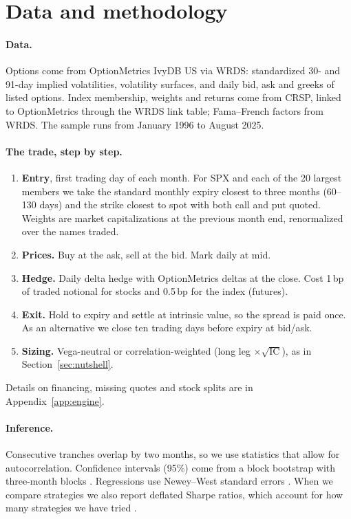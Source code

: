 \section{Data and methodology}\label{sec:data}

\paragraph{Data.} Options come from OptionMetrics IvyDB US via WRDS: standardized 30- and 91-day implied volatilities, volatility surfaces, and daily bid, ask and greeks of listed options. Index membership, weights and returns come from CRSP, linked to OptionMetrics through the WRDS link table; Fama--French factors from WRDS. The sample runs from January 1996 to August 2025.

\paragraph{The trade, step by step.}
\begin{enumerate}
  \item \textbf{Entry}, first trading day of each month. For SPX and each of the 20 largest members we take the standard monthly expiry closest to three months (60--130 days) and the strike closest to spot with both call and put quoted. Weights are market capitalizations at the previous month end, renormalized over the names traded.
  \item \textbf{Prices.} Buy at the ask, sell at the bid. Mark daily at mid.
  \item \textbf{Hedge.} Daily delta hedge with OptionMetrics deltas at the close. Cost 1\,bp of traded notional for stocks and 0.5\,bp for the index (futures).
  \item \textbf{Exit.} Hold to expiry and settle at intrinsic value, so the spread is paid once. As an alternative we close ten trading days before expiry at bid/ask.
  \item \textbf{Sizing.} Vega-neutral or correlation-weighted (long leg $\times\sqrt{\text{IC}}$), as in Section~\ref{sec:nutshell}.
\end{enumerate}
Details on financing, missing quotes and stock splits are in Appendix~\ref{app:engine}.

\paragraph{Inference.} Consecutive tranches overlap by two months, so we use statistics that allow for autocorrelation. Confidence intervals (95\%) come from a block bootstrap with three-month blocks \citep{Kunsch1989}. Regressions use Newey--West standard errors \citep{NeweyWest1987}. When we compare strategies we also report deflated Sharpe ratios, which account for how many strategies we have tried \citep{BaileyLopezdePrado2014}.

